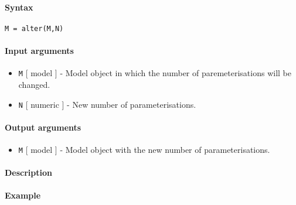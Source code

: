 


	\paragraph{Syntax}\label{syntax}

\begin{verbatim}
M = alter(M,N)
\end{verbatim}

\paragraph{Input arguments}\label{input-arguments}

\begin{itemize}
\item
  \texttt{M} {[} model {]} - Model object in which the number of
  paremeterisations will be changed.
\item
  \texttt{N} {[} numeric {]} - New number of parameterisations.
\end{itemize}

\paragraph{Output arguments}\label{output-arguments}

\begin{itemize}
\itemsep1pt\parskip0pt
\item
  \texttt{M} {[} model {]} - Model object with the new number of
  parameterisations.
\end{itemize}

\paragraph{Description}\label{description}

\paragraph{Example}\label{example}


